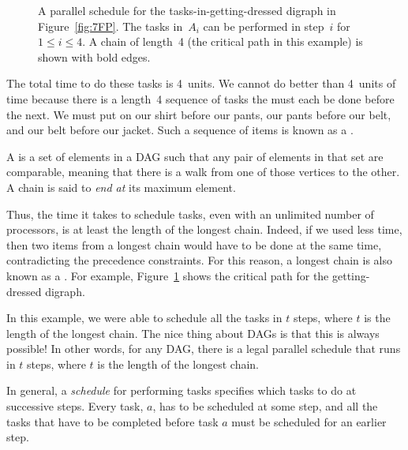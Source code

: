 \begin{figure}


\caption{A parallel schedule for the tasks-in-getting-dressed digraph in
Figure~\ref{fig:7FP}.  The tasks in~$A_i$ can be performed in step~$i$
for $1 \le i \le 4$.  A chain of length~4 (the critical path in this
example) is shown with bold edges.}

\label{fig:7FS}

\end{figure}

The total time to do these tasks is 4~units.  We cannot do better than
4~units of time because there is a length~4 sequence of tasks the must
each be done before the next.  We must put on our shirt before our
pants, our pants before our belt, and our belt before our jacket.
Such a sequence of items is known as a .

\begin{definition}
A  is a set of elements in a DAG such that any pair of
elements in that set are comparable, meaning that there is a walk from
one of those vertices to the other.  A chain is said to \emph{end at} its maximum element.
\end{definition}

Thus, the time it takes to schedule tasks, even with an unlimited
number of processors, is at least the length of the longest chain.
Indeed, if we used less time, then two items from a longest chain
would have to be done at the same time, contradicting the precedence
constraints.  For this reason, a longest chain is also known as a
.  For example, Figure~\ref{fig:7FS} shows the
critical path for the getting-dressed digraph.

In this example, we were able to schedule all the tasks in $t$
steps, where $t$ is the length of the longest chain.  The nice
thing about DAGs is that this is always possible!  In other words,
for any DAG, there is a legal parallel schedule that runs in $t$
steps, where $t$ is the length of the longest chain.

In general, a \emph{schedule} for performing tasks specifies which
tasks to do at successive steps.  Every task, $a$, has to be scheduled
at some step, and all the tasks that have to be completed before task
$a$ must be scheduled for an earlier step.


